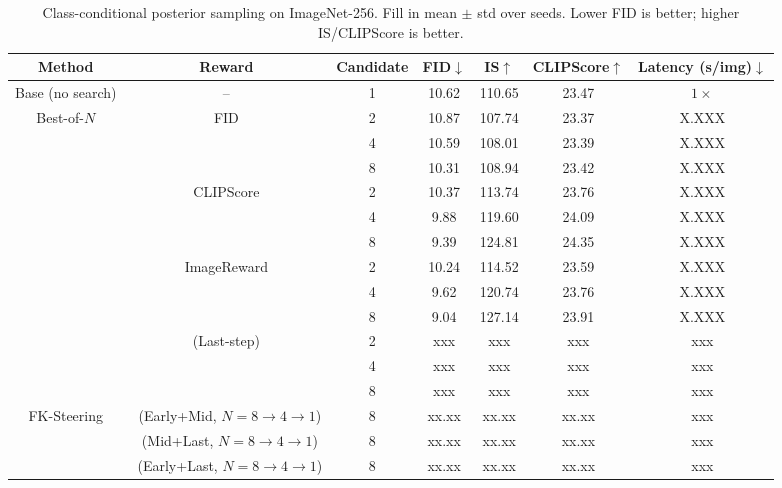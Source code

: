 \documentclass{article}
\newcommand{\method}{\text{Diffusion Ranker}\xspace}
\begin{document}
\begin{table}[htbp]
\centering
\caption{Class-conditional posterior sampling on ImageNet-256. Fill in mean $\pm$ std over seeds. Lower FID is better; higher IS/CLIPScore is better.}
\label{tab:main_class_cond}
\begin{tabular}{ccccccc}
\toprule
Method & Reward & Candidate & FID$\downarrow$ & IS$\uparrow$ & CLIPScore$\uparrow$ & Latency (s/img)$\downarrow$ \\
\midrule
Base (no search) & -- & 1 & 10.62 & 110.65 & 23.47 & $1\times$ \\
\midrule
\multirow{12}{*}{Best-of-$N$} & \multirow{3}{*}{FID} & 2 & 10.87 & 107.74 & 23.37 & X.XXX \\
 &  & 4 & 10.59 & 108.01 & 23.39 & X.XXX \\
 &  & 8 & 10.31 & 108.94 & 23.42 & X.XXX \\
\cmidrule(lr){2-7}
 & \multirow{3}{*}{CLIPScore} & 2 & 10.37 & 113.74 & 23.76 & X.XXX \\
 &  & 4 & 9.88 & 119.60 & 24.09 & X.XXX \\
 &  & 8 & 9.39 & 124.81 & 24.35 & X.XXX \\
\cmidrule(lr){2-7}
 & \multirow{3}{*}{ImageReward} & 2 & 10.24 & 114.52 & 23.59 & X.XXX \\
 &  & 4 & 9.62 & 120.74 & 23.76 & X.XXX \\
 &  & 8 & 9.04 & 127.14 & 23.91 & X.XXX \\
\cmidrule(lr){2-7}
 & \multirow{3}{*}{\method (Last-step)} & 2 & xxx & xxx & xxx & xxx \\
 &  & 4 & xxx & xxx & xxx & xxx \\
 &  & 8 & xxx & xxx & xxx & xxx \\
\midrule
\multirow{3}{*}{FK-Steering}
& \method\ (Early+Mid, $N{=}8\!\to\!4\!\to\!1$) & 8 & xx.xx & xx.xx & xx.xx & xxx \\
& \method\ (Mid+Last, $N{=}8\!\to\!4\!\to\!1$)  & 8 & xx.xx & xx.xx & xx.xx & xxx \\
& \method\ (Early+Last, $N{=}8\!\to\!4\!\to\!1$) & 8 & xx.xx & xx.xx & xx.xx & xxx \\
\bottomrule
\end{tabular}
\end{table}
\end{document}
